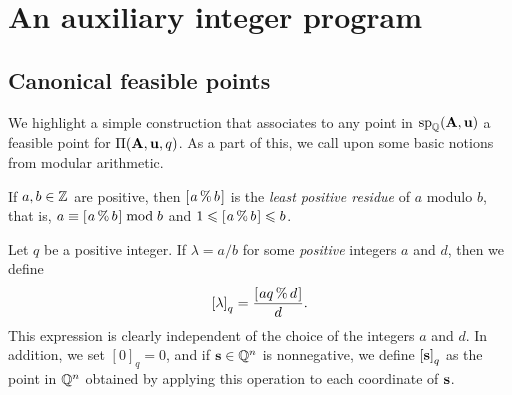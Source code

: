 \documentclass{amsart}
\begin{document}



\section{An auxiliary integer program}

\subsection{Canonical feasible points}

We highlight a simple construction that associates to any point in $\operatorname{sp}_{\mathbb{Q}}(\mathbf{A}, \mathbf{u})$ a feasible point for $\Pi(\mathbf{A}, \mathbf{u}, q)$.
As a part of this, we call upon some basic notions from modular arithmetic.

\begin{definition}
   If $a, b \in \mathbb{Z}$ are positive, then $[ \hspace{.01in} a \, \% \, b \hspace{.01in} ]$ is the \emph{least positive residue} of $a$ modulo $b$, that is, $a \equiv [ \hspace{.01in} a \, \% \, b \hspace{.01in} ] \bmod b$ and $1 \leqslant [ \hspace{.01in} a \, \% \, b \hspace{.01in} ] \leqslant b$.
\end{definition}

\begin{definition}
   \label{tail: D}
   Let $q$ be a positive integer.
   If $\lambda = a/b$ for some \emph{positive} integers $a$ and $d$, then we define
   \[ \left[ \lambda \right]_q = \frac{ [ \hspace{.01in} aq \, \% \, d \hspace{.01in} ]}{d}. \]
   This expression is clearly independent of the choice of the integers $a$ and $d$.
   In addition, we set  $[0]_q = 0$, and if $\mathbf{s} \in \mathbb{Q}^n$ is nonnegative, we define $\left[ \mathbf{s} \right]_q$ as the point in $\mathbb{Q}^n$ obtained by applying this operation to each coordinate of $\mathbf{s}$.
\end{definition}
\end{document}
